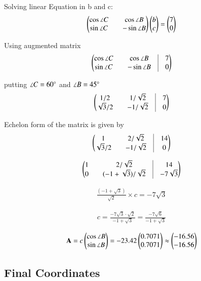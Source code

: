 \documentclass{article}
\begin{document}
Solving linear Equation in b and c:
\begin{align}
    \begin{pmatrix}\cos \angle C && \cos \angle B \\
    \sin \angle C && -\sin \angle B\end{pmatrix} \begin{pmatrix}b \\ c\end{pmatrix} = \begin{pmatrix}7 \\ 0\end{pmatrix}
\end{align}

Using augmented matrix
\begin{align}
    \myvec{\cos \angle C && \cos \angle B &\vrule &7 \\
    \sin \angle C && -\sin \angle B &\vrule &0}
\end{align}

putting $\angle C = 60 \degree$ and $\angle B = 45 \degree$
\begin{align}
    \myvec{1/2 && 1/\sqrt{2} &\vrule &7 \\
    \sqrt{3}/2 && -1/\sqrt{2} &\vrule &0}
\end{align}

Echelon form of the matrix is given by
\begin{align}
    \myvec{1 && 2/\sqrt{2} &\vrule &14 \\
    \sqrt{3}/2 && -1/\sqrt{2} &\vrule &0}
\end{align}

\begin{align}
    \myvec{1 && 2/\sqrt{2} &\vrule &14 \\
    0 && (-1 + \sqrt{3})/\sqrt{2} &\vrule &-7\sqrt{3}}
\end{align}

\begin{align}
    \frac{(- 1 + \sqrt{3})}{\sqrt{2}} \times c = - 7 \sqrt{3}
\end{align}

\begin{align}
    c = \frac{-7\sqrt{3} \cdot \sqrt{2}}{-1 + \sqrt{3}} = \frac{-7\sqrt{6}}{-1 + \sqrt{3}}
\end{align}

\begin{align}
\mathbf{A} = c \begin{pmatrix}\cos \angle B \\ \sin \angle B\end{pmatrix} = -23.42 \begin{pmatrix}0.7071 \\ 0.7071\end{pmatrix} \approx \begin{pmatrix}-16.56 \\ -16.56\end{pmatrix}
\end{align}

\subsection*{Final Coordinates}
\end{document}
